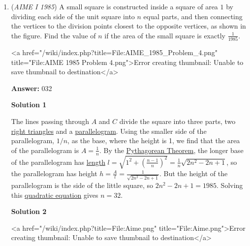 \begin{enumerate}
 \textbf{Video Solution by SpreadTheMathLove} 


	\item (\textit{AIME I 1985}) A small  square is constructed inside a square of area $1$ by dividing each side of the unit square into $n$ equal parts, and then connecting the  vertices to the division points closest to the opposite vertices, as shown in the figure. Find the value of $n$ if the area of the small square is exactly $\frac1{1985}$.


 <a href="/wiki/index.php?title=File:AIME\_1985\_Problem\_4.png" title="File:AIME 1985 Problem 4.png">Error creating thumbnail: Unable to save thumbnail to destination</a>

 \textbf{Answer: }032



\textbf{Solution 1}

The lines passing through $A$ and $C$ divide the square into three parts, two \href{https://artofproblemsolving.com/wiki/index.php?title=Right\_triangle}{right triangles} and a \href{https://artofproblemsolving.com/wiki/index.php?title=Parallelogram}{parallelogram}.  Using the smaller side of the parallelogram, $1/n$, as the base, where the height is 1, we find that the area of the parallelogram is $A = \frac{1}{n}$.  By the \href{https://artofproblemsolving.com/wiki/index.php?title=Pythagorean\_Theorem}{Pythagorean Theorem}, the longer base of the parallelogram has \href{https://artofproblemsolving.com/wiki/index.php?title=Length}{length} $l = \sqrt{1^2 + \left(\frac{n - 1}{n}\right)^2} = \frac{1}{n}\sqrt{2n^2 - 2n + 1}$, so the parallelogram has height $h = \frac{A}{l} = \frac{1}{\sqrt{2n^2 - 2n + 1}}$.  But the height of the parallelogram is the side of the little square, so $2n^2 - 2n + 1 = 1985$.  Solving this \href{https://artofproblemsolving.com/wiki/index.php?title=Quadratic\_equation}{quadratic equation} gives $n = \boxed{32}$.

 



\textbf{Solution 2}

<a href="/wiki/index.php?title=File:Aime.png" title="File:Aime.png">Error creating thumbnail: Unable to save thumbnail to destination</a>


\end{enumerate}

